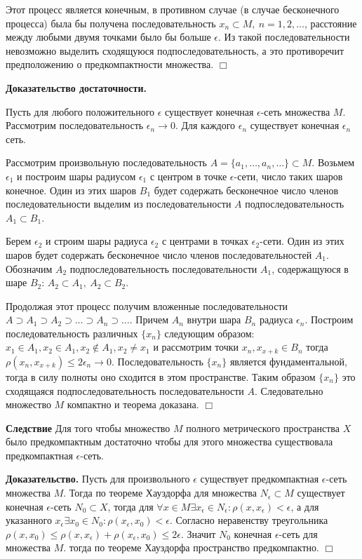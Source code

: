 \documentclass[14pt,a4paper]{extarticle}
\theoremstyle{definition}
\theoremstyle{remark}
\newcommand{\sep}{ , \ \allowbreak }
\renewcommand{\[}{\begin{dmath*}[compact]}
\renewcommand{\]}{\end{dmath*}}
\newcommand{\btev}[1][]{\textbf{Доказательство#1.}
}
\newcommand{\etev}{$\Box$}
\begin{document}
  Этот процесс является конечным, в противном случае (в случае бесконечного процесса) была бы получена последовательность ${x_n}\subset M\sep n=1,2,\dots$, расстояние между любыми двумя точками было бы больше $\epsilon$. Из такой последовательности невозможно выделить сходящуюся подпоследовательность, а это противоречит предположению о предкомпактности множества.
\etev

\btev[ достаточности]
  Пусть для любого положительного $\epsilon$ существует конечная $\epsilon$-сеть множества $M$. Рассмотрим последовательность $\epsilon_n \to 0$. Для каждого $\epsilon_n$ существует конечная $\epsilon_n$ сеть.

  Рассмотрим произвольную последовательность $A=\{a_{1},\dots,a_n,\dots\}\subset M$. Возьмем $\epsilon_1$ и построим шары радиусом $\epsilon_1$ с центром в точке $\epsilon$-сети, число таких шаров конечное. Один из этих шаров $B_1$ будет содержать бесконечное число членов последовательности выделим из последовательности $A$ подпоследовательность $A_1\subset B_1$.

  Берем $\epsilon_2$ и строим шары радиуса $\epsilon_2$ с центрами в точках $\epsilon_2$-сети. Один из этих шаров будет содержать бесконечное число членов последовательностей $A_1$. Обозначим $A_2$ подпоследовательность последовательности $A_1$, содержащуюся в шаре $B_2$: $A_2\subset A_1\sep A_2\subset B_2$.

  Продолжая этот процесс получим вложенные последовательности $A\supset A_1\supset A_2\supset \dots\supset A_n\supset \dots$. Причем $A_n$ внутри шара $B_n$ радиуса $\epsilon_n$. Построим последовательность различных $\{x_n\}$ следующим образом: $x_1 \in A_1, x_2 \in A_1, x_2 \not\in A_1, x_2 \neq x_1$ и рассмотрим точки $x_n, x_{x+k} \in B_n$ тогда $\rho(x_n,x_{x+k})\leq 2 \epsilon_n \to 0$. Последовательность $\{x_n\}$ является фундаментальной, тогда в силу полноты оно сходится в этом пространстве. Таким образом $\{x_n\}$ это сходящаяся подпоследовательность последовательности $A$. Следовательно множество $M$ компактно и теорема доказана.
\etev

\textbf{Следствие} Для того чтобы множество $M$ полного метрического пространства $X$ было предкомпактным достаточно чтобы для этого множества существовала предкомпактная $\epsilon$-сеть.

\btev[] Пусть для произвольного $\epsilon$ существует предкомпактная $\epsilon$-сеть множества $M$. Тогда по теореме Хауздорфа для множества $N_\epsilon \subset M$ существует конечная $\epsilon$-сеть $N_0 \subset X$, тогда для $\forall x \in M \exists x_\epsilon \in N_\epsilon: \rho(x,x_\epsilon) < \epsilon$, а для указанного $x_\epsilon \exists x_0\in N_0: \rho(x_\epsilon,x_0)<\epsilon$. Согласно неравенству треугольника $\rho(x,x_0)\leq \rho(x,x_\epsilon) + \rho(x_\epsilon,x_0) \leq 2\epsilon$. Значит $N_0$ конечная $\epsilon$-сеть для множества $M$. тогда по теореме Хауздорфа пространство предкомпактно. \etev
\end{document}
